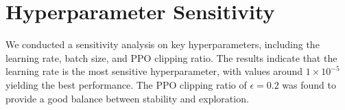 \section{Hyperparameter Sensitivity}

We conducted a sensitivity analysis on key hyperparameters, including the learning rate, batch size, and PPO clipping ratio. The results indicate that the learning rate is the most sensitive hyperparameter, with values around $1 \times 10^{-5}$ yielding the best performance. The PPO clipping ratio of $\epsilon = 0.2$ was found to provide a good balance between stability and exploration.

\endgroup

